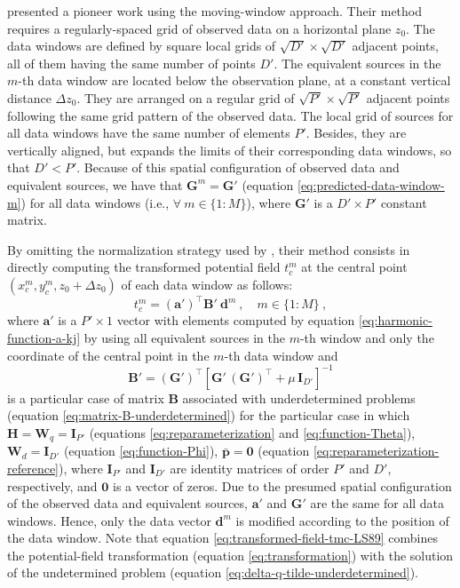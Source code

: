 \documentclass[utf8]{FrontiersinHarvard} %
\begin{document}
	\cite{leao-silva1989} presented a pioneer work using the moving-window approach.
	Their method requires a regularly-spaced grid of observed data on a horizontal plane $z_{0}$. 
	The data windows are defined by square local grids of $\sqrt{D'} \times \sqrt{D'}$ adjacent points, all of them having the
	same number of points $D'$.
	The equivalent sources in the $m$-th data window are located below the observation plane, at a constant vertical distance
	$\Delta z_{0}$. They are arranged on a regular grid of $\sqrt{P'} \times \sqrt{P'}$ adjacent points 
	following the same grid pattern of the observed data. 
	The local grid of sources for all data windows have the same number of elements $P'$.
	Besides, they are vertically aligned, but expands the limits of their corresponding data windows,
	so that $D' < P'$.
	Because of this spatial configuration of observed data and equivalent sources, we have that
	$\mathbf{G}^{m} = \mathbf{G}'$ (equation \ref{eq:predicted-data-window-m}) for all data windows 
	(i.e., $\forall \: m \in \{1 : M\}$), where $\mathbf{G}'$ is a $D' \times P'$ constant matrix.
	
	By omitting the normalization strategy used by \cite{leao-silva1989}, their method consists in 
	directly computing the transformed potential field $t^{m}_{c}$ at the central point $(x^{m}_{c}, y^{m}_{c}, z_{0} + \Delta z_{0})$ 
	of each data window as follows:
	\begin{equation}
		t^{m}_{c} = \left( \mathbf{a}' \right)^{\top} \mathbf{B}' \: \mathbf{d}^{m} \: , \quad m \in \{ 1 : M \} \: ,
		\label{eq:transformed-field-tmc-LS89}
	\end{equation}
	where $\mathbf{a}'$ is a $P' \times 1$ vector with elements computed by equation 
	\ref{eq:harmonic-function-a-kj} by using all equivalent sources in the $m$-th window and
	only the coordinate of the central point in the $m$-th data window and
	\begin{equation}
		\mathbf{B}'  = \left( \mathbf{G}' \right)^{\top} 
		\left[ \mathbf{G}' \, \left( \mathbf{G}' \right)^{\top} + \mu \, \mathbf{I}_{D'} \right]^{-1} 
		\label{eq:dummy-matrix-LS89}
	\end{equation}
	is a particular case of matrix $\mathbf{B}$ associated with underdetermined problems (equation \ref{eq:matrix-B-underdetermined}) 
	for the particular case in which $\mathbf{H} = \mathbf{W}_{q} = \mathbf{I}_{P'}$ (equations \ref{eq:reparameterization} and \ref{eq:function-Theta}),
	$\mathbf{W}_{d} = \mathbf{I}_{D'}$ (equation \ref{eq:function-Phi}), $\bar{\mathbf{p}} = \mathbf{0}$ 
	(equation \ref{eq:reparameterization-reference}), where $\mathbf{I}_{P'}$ and $\mathbf{I}_{D'}$ are identity matrices 
	of order $P'$ and $D'$, respectively, and $\mathbf{0}$ is a vector of zeros. 
	Due to the presumed spatial configuration of the observed 
	data and equivalent sources, $\mathbf{a}'$ and $\mathbf{G}'$ are the same for all data windows.
	Hence, only the data vector $\mathbf{d}^{m}$ is modified according to the position of the data window.
	Note that equation \ref{eq:transformed-field-tmc-LS89} combines the potential-field transformation
	(equation \ref{eq:transformation}) with the solution of the undetermined problem
	(equation \ref{eq:delta-q-tilde-underdetermined}).
	
\end{document}
